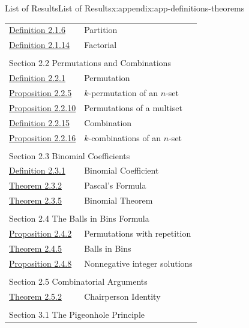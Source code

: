 \documentclass[oneside,10pt,]{book}
\numberwithin{equation}{section}
\begin{document}
\begin{appendixptx}{List of Results}{}{List of Results}{}{}{x:appendix:app-definitions-theorems}
\begin{longtable}[l]{ll}
\hyperref[x:definition:def-partition]{Definition 2.1.6}& Partition\\
\hyperref[x:definition:def-factorial]{Definition 2.1.14}& Factorial\\
\multicolumn{2}{l}{\null}\\[1.5ex] \multicolumn{2}{l}{\large Section 2.2 Permutations and Combinations}\\[0.5ex]
\hyperref[x:definition:def-permutation]{Definition 2.2.1}& Permutation\\
\hyperref[x:proposition:prop-Pnk]{Proposition 2.2.5}& \(k\)-permutation of an \(n\)-set\\
\hyperref[x:proposition:prop-perm-repeat]{Proposition 2.2.10}& Permutations of a multiset\\
\hyperref[x:definition:def-combination]{Definition 2.2.15}& Combination\\
\hyperref[x:proposition:prop-comb]{Proposition 2.2.16}& \(k\)-combinations of an \(n\)-set\\
\multicolumn{2}{l}{\null}\\[1.5ex] \multicolumn{2}{l}{\large Section 2.3 Binomial Coefficients}\\[0.5ex]
\hyperref[x:definition:def-binomial-coefficient]{Definition 2.3.1}& Binomial Coefficient\\
\hyperref[x:theorem:thm-pascals-formula]{Theorem 2.3.2}& Pascal's Formula\\
\hyperref[x:theorem:thm-binomial]{Theorem 2.3.5}& Binomial Theorem\\
\multicolumn{2}{l}{\null}\\[1.5ex] \multicolumn{2}{l}{\large Section 2.4 The Balls in Bins Formula}\\[0.5ex]
\hyperref[x:proposition:prop-perm-repetition]{Proposition 2.4.2}& Permutations with repetition\\
\hyperref[x:theorem:thm-comb-replace]{Theorem 2.4.5}& Balls in Bins\\
\hyperref[x:proposition:prop-nonnegative]{Proposition 2.4.8}& Nonnegative integer solutions\\
\multicolumn{2}{l}{\null}\\[1.5ex] \multicolumn{2}{l}{\large Section 2.5 Combinatorial Arguments}\\[0.5ex]
\hyperref[x:theorem:thm-chairperson]{Theorem 2.5.2}& Chairperson Identity\\
\multicolumn{2}{l}{\null}\\[1.5ex] \multicolumn{2}{l}{\large Section 3.1 The Pigeonhole Principle}\\[0.5ex]

\end{longtable}
\end{appendixptx}
\end{document}
